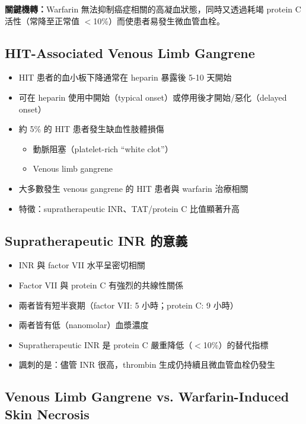 \documentclass[12pt,a4paper]{article}
\begin{document}
\begin{importantbox}
\textbf{關鍵機轉：}Warfarin 無法抑制癌症相關的高凝血狀態，同時又透過耗竭 protein C 活性（常降至正常值 $<$10\%）而使患者易發生微血管血栓。
\end{importantbox}

\subsection{HIT-Associated Venous Limb Gangrene}

\begin{itemize}
    \item HIT 患者的血小板下降通常在 heparin 暴露後 5-10 天開始
    \item 可在 heparin 使用中開始（typical onset）或停用後才開始/惡化（delayed onset）
    \item 約 5\% 的 HIT 患者發生缺血性肢體損傷
    \begin{itemize}
        \item 動脈阻塞（platelet-rich ``white clot''）
        \item Venous limb gangrene
    \end{itemize}
    \item 大多數發生 venous gangrene 的 HIT 患者與 warfarin 治療相關
    \item 特徵：supratherapeutic INR、TAT/protein C 比值顯著升高
\end{itemize}

\subsection{Supratherapeutic INR 的意義}

\begin{itemize}
    \item INR 與 factor VII 水平呈密切相關
    \item Factor VII 與 protein C 有強烈的共線性關係
    \item 兩者皆有短半衰期（factor VII: 5 小時；protein C: 9 小時）
    \item 兩者皆有低（nanomolar）血漿濃度
    \item Supratherapeutic INR 是 protein C 嚴重降低（$<$10\%）的替代指標
    \item 諷刺的是：儘管 INR 很高，thrombin 生成仍持續且微血管血栓仍發生
\end{itemize}

\subsection{Venous Limb Gangrene vs. Warfarin-Induced Skin Necrosis}
\end{document}
